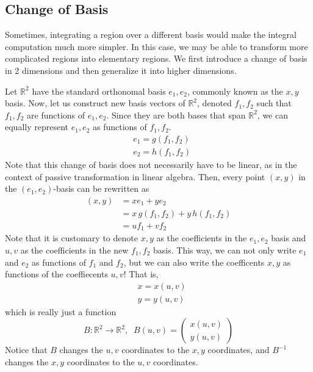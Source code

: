 \subsection{Change of Basis}

  Sometimes, integrating a region over a different basis would make the integral computation much more simpler. In this case, we may be able to transform more complicated regions into elementary regions. We first introduce a change of basis in 2 dimensions and then generalize it into higher dimensions. 
  
  Let $\mathbb{R}^2$ have the standard orthonomal basis $e_1, e_2$, commonly known as the $x, y$ basis. Now, let us construct new basis vectors of $\mathbb{R}^2$, denoted $f_1, f_2$ such that $f_1, f_2$ are functions of $e_1, e_2$. Since they are both bases that span $\mathbb{R}^2$, we can equally represent $e_1, e_2$ as functions of $f_1, f_2$. 
  \begin{align*}
      &e_1 = g(f_1, f_2)\\
      &e_2 = h(f_1, f_2) 
  \end{align*}
  Note that this change of basis does not necessarily have to be linear, as in the context of passive transformation in linear algebra. Then, every point $(x,y)$ in the $(e_1, e_2)$-basis can be rewritten as
  \begin{align*}
      (x, y) & = x e_1 + y e_2 \\
      & = x \, g(f_1, f_2) + y \, h(f_1, f_2) \\
      & = u f_1 + v f_2
  \end{align*}
  Note that it is customary to denote $x, y$ as the coefficients in the $e_1, e_2$ basis and $u, v$ as the coefficients in the new $f_1, f_2$ basis. This way, we can not only write $e_1$ and $e_2$ as functions of $f_1$ and $f_2$, but we can also write the coefficents $x, y$ as functions of the coeffiecents $u, v$! That is, 
  \begin{align*}
      & x = x(u, v) \\
      & y = y(u, v)
  \end{align*}
  which is really just a function 
  \begin{equation}
    B: \mathbb{R}^2 \to \mathbb{R}^2, \;\; B(u, v) = \begin{pmatrix} x(u, v) \\ y(u, v) \end{pmatrix}
  \end{equation}
  Notice that $B$ changes the $u, v$ coordinates to the $x, y$ coordinates, and $B^{-1}$ changes the $x, y$ coordinates to the $u, v$ coordinates. 
